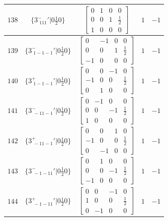 \documentclass[fleqn,8pt]{jsarticle}
\begin{document}
\begin{longtable}{ccccc}
$ 138 $ & $ \{3^{-}_{\,\,111}{}'|0 \frac{1}{2} 0\} $ & $ \begin{bmatrix} 0 & 1 & 0 & 0 \\ 0 & 0 & 1 & \frac{1}{2} \\ 1 & 0 & 0 & 0 \end{bmatrix} $ & $ 1 $ & $ -1 $ \\ \hline
$ 139 $ & $ \{3^{-}_{\,\,1-1-1}{}'|0 \frac{1}{2} 0\} $ & $ \begin{bmatrix} 0 & -1 & 0 & 0 \\ 0 & 0 & 1 & \frac{1}{2} \\ -1 & 0 & 0 & 0 \end{bmatrix} $ & $ 1 $ & $ -1 $ \\ \hline
$ 140 $ & $ \{3^{+}_{\,\,1-1-1}{}'|0 \frac{1}{2} 0\} $ & $ \begin{bmatrix} 0 & 0 & -1 & 0 \\ -1 & 0 & 0 & \frac{1}{2} \\ 0 & 1 & 0 & 0 \end{bmatrix} $ & $ 1 $ & $ -1 $ \\ \hline
$ 141 $ & $ \{3^{-}_{\,\,-11-1}{}'|0 \frac{1}{2} 0\} $ & $ \begin{bmatrix} 0 & -1 & 0 & 0 \\ 0 & 0 & -1 & \frac{1}{2} \\ 1 & 0 & 0 & 0 \end{bmatrix} $ & $ 1 $ & $ -1 $ \\ \hline
$ 142 $ & $ \{3^{+}_{\,\,-11-1}{}'|0 \frac{1}{2} 0\} $ & $ \begin{bmatrix} 0 & 0 & 1 & 0 \\ -1 & 0 & 0 & \frac{1}{2} \\ 0 & -1 & 0 & 0 \end{bmatrix} $ & $ 1 $ & $ -1 $ \\ \hline
$ 143 $ & $ \{3^{-}_{\,\,-1-11}{}'|0 \frac{1}{2} 0\} $ & $ \begin{bmatrix} 0 & 1 & 0 & 0 \\ 0 & 0 & -1 & \frac{1}{2} \\ -1 & 0 & 0 & 0 \end{bmatrix} $ & $ 1 $ & $ -1 $ \\ \hline
$ 144 $ & $ \{3^{+}_{\,\,-1-11}{}'|0 \frac{1}{2} 0\} $ & $ \begin{bmatrix} 0 & 0 & -1 & 0 \\ 1 & 0 & 0 & \frac{1}{2} \\ 0 & -1 & 0 & 0 \end{bmatrix} $ & $ 1 $ & $ -1 $ \\ \hline

\end{longtable}
\end{document}
